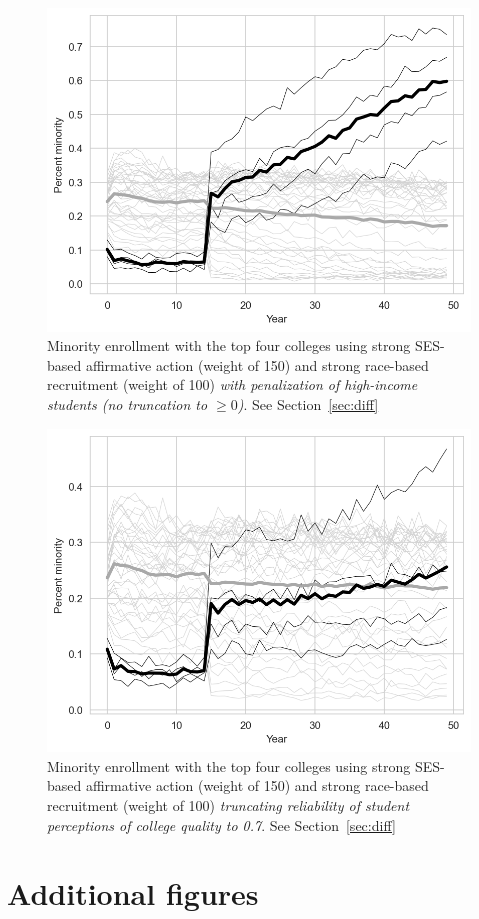 \begin{appendices}
\begin{figure}[H]
  \centering
  \includegraphics[width=.79\textwidth]{figures/figC4_pen.png}
  \caption{Minority enrollment with the top four colleges using strong SES-based affirmative action (weight of 150) and strong race-based recruitment (weight of 100) \emph{with penalization of high-income students (no truncation to $\geq 0$)}. See Section~\ref{sec:diff}}
  \label{fig:c4_pen}
\end{figure}

\begin{figure}[H]
  \centering
  \includegraphics[width=.79\textwidth]{figures/figC4_pq07.png}
  \caption{Minority enrollment with the top four colleges using strong SES-based affirmative action (weight of 150) and strong race-based recruitment (weight of 100) \emph{truncating reliability of student perceptions of college quality to 0.7}. See Section~\ref{sec:diff}}
  \label{fig:c4_pq07}
\end{figure}

\section{Additional figures}\label{sec:add}


\end{appendices}
